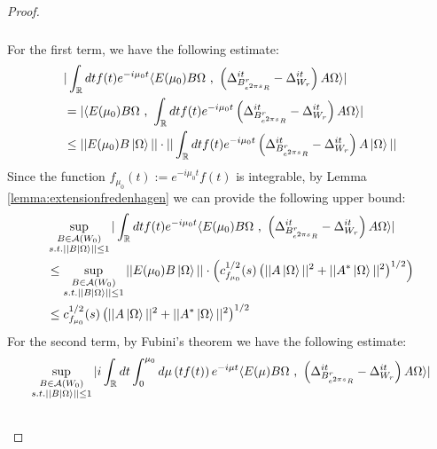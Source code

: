 \documentclass[a4paper,11pt]{article}
\theoremstyle{definition}
\newcommand{\lb}{\left(}
\newcommand{\rb}{\right)}
\begin{document}
\begin{proof}
\begin{align}
\begin{split}
        \end{split}
    \end{align}
    For the first term, we have the following estimate:
    \begin{align}
        \begin{split}
            &|\int_\mathbb{R} dt f(t)e^{-i\mu_0 t}\langle E(\mu_0) B\Omega\text{ , }\lb\Delta^{it}_{B^r_{e^{2\pi s}R}} - \Delta^{it}_{W_r}\rb A\Omega\rangle|
            \\&
            =|\langle E(\mu_0)B\Omega\text{ , }\int_\mathbb{R}dt f(t)e^{-i\mu_0 t}\lb\Delta^{it}_{B^r_{e^{2\pi s}R}} - \Delta^{it}_{W_r}\rb A\Omega\rangle|
            \\&
            \leq ||E(\mu_0)B\ket{\Omega}||\cdot||\int_\mathbb{R} dt f(t) e^{-i\mu_0 t}\lb\Delta^{it}_{B^r_{e^{2\pi s}R}} - \Delta^{it}_{W_r}\rb A\ket{\Omega}||
        \end{split}
    \end{align}
    Since the function $f_{\mu_0}(t) := e^{-i\mu_0 t}f(t)$ is integrable, by Lemma \ref{lemma:extensionfredenhagen} we can provide the following upper bound:
    \begin{align}
        \begin{split}
            &\sup_{\substack{B\in\mathcal{A}(W_0)\\s.t.||B\ket{\Omega}||\leq 1}}|\int_\mathbb{R} dt f(t) e^{-i\mu_0 t}\langle E(\mu_0)B\Omega\text{ , }\lb\Delta^{it}_{B^r_{e^{2\pi s}R}} - \Delta^{it}_{W_r}\rb A\Omega\rangle|
            \\&
            \leq \sup_{\substack{B\in\mathcal{A}(W_0)\\s.t.||B\ket{\Omega}||\leq 1}}||E(\mu_0)B\ket{\Omega}||\cdot\lb c_{f_{\mu_0}}^{1/2}(s)\lb||A\ket{\Omega}||^2 + ||A^*\ket{\Omega}||^2\rb^{1/2}\rb
            \\&
            \leq c_{f_{\mu_0}}^{1/2}(s)\lb||A\ket{\Omega}||^2 + ||A^*\ket{\Omega}||^2\rb^{1/2}
        \end{split}
    \end{align}
    For the second term, by Fubini's theorem we have the following estimate:
    \begin{align}
        \begin{split}
            &\sup_{\substack{B\in\mathcal{A}(W_0)\\s.t.||B\ket{\Omega}||\leq 1}}|i\int_\mathbb{R} dt \int_0^{\mu_0}d\mu \lb tf(t)\rb e^{-i\mu t}\langle E(\mu)B\Omega\text{ , }\lb\Delta^{it}_{B^r_{e^{2\pi s}R}} - \Delta^{it}_{W_r}\rb A\Omega \rangle|
            \\&

\end{split}
\end{align}
\end{proof}
\end{document}
